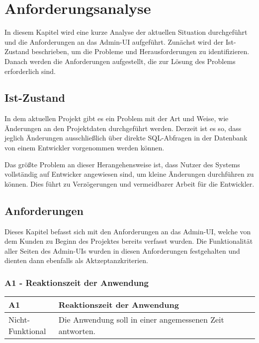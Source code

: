 \newpage
\section{Anforderungsanalyse}
In diesem Kapitel wird eine kurze Analyse der aktuellen Situation durchgeführt und die Anforderungen an das Admin-UI aufgeführt. Zunächst wird der Ist-Zustand beschrieben, um die Probleme und Herausforderungen zu identifizieren.
Danach werden die Anforderungen aufgestellt, die zur Lösung des Problems erforderlich sind.

\subsection[Ist-Zustand]{Ist-Zustand}
In dem aktuellen Projekt gibt es ein Problem mit der Art und Weise, wie Änderungen an den Projektdaten durchgeführt werden.
Derzeit ist es so, dass jeglich Änderungen ausschließlich über direkte SQL-Abfragen in der Datenbank von einem Entwickler vorgenommen werden können.

Das größte Problem an dieser Herangehensweise ist, dass Nutzer des Systems vollständig auf Entwicker angewiesen sind, um kleine Änderungen durchführen zu können.
Dies führt zu Verzögerungen und vermeidbarer Arbeit für die Entwickler.

\subsection[Anforderungen]{Anforderungen}
Dieses Kapitel befasst sich mit den Anforderungen an das Admin-UI, welche von dem Kunden zu Beginn des Projektes bereits verfasst wurden.
Die Funktionalität aller Seiten des Admin-UIs wurden in diesen Anforderungen festgehalten und dienten dann ebenfalls als Aktzeptanzkriterien.

\subsubsection[A1 - Reaktionszeit der Anwendung]{A1 - Reaktionszeit der Anwendung}

\begin{center}
    \begin{tabular}{ |p{0.2\linewidth}|p{0.8\linewidth}| } 
        \hline
        \rowcolor{lightgray}
        \textbf{A1} & \textbf{Reaktionszeit der Anwendung} \\
        \hline
        Nicht-Funktional &  Die Anwendung soll in einer angemessenen Zeit antworten.\\ 
        \hline
    \end{tabular}
\end{center}

